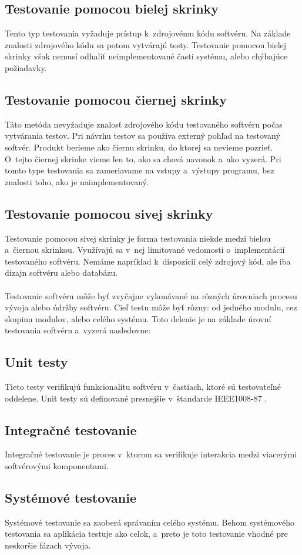 \subsection*{Testovanie pomocou bielej skrinky}
Tento typ testovania vyžaduje prístup k~zdrojovému kódu softvéru. Na základe znalosti zdrojového kódu sa potom vytvárajú testy.
Testovanie pomocou bielej skrinky však nemusí odhaliť neimplementované časti systému, alebo chýbajúce požiadavky.
\subsection*{Testovanie pomocou čiernej skrinky}
Táto metóda nevyžaduje znalosť zdrojového kódu testovaného softvéru počas vytvárania testov.
Pri návrhu testov sa používa externý pohľad na testovaný softvér. 
Produkt berieme ako čiernu skrinku, do ktorej sa nevieme pozrieť.
O~tejto čiernej skrinke vieme len to, ako sa chová navonok a~ako vyzerá.
Pri tomto type testovania sa zameriavame na vstupy a~výstupy programu, bez znalosti toho, ako je naimplementovaný.
\subsection*{Testovanie pomocou sivej skrinky}
Testovanie pomocou sivej skrinky je forma testovania niekde medzi bielou a~čiernou skrinkou. 
Využívajú sa v~nej limitované vedomosti o~implementácií testovaného softvéru.
Nemáme napríklad k~dispozícií celý zdrojový kód, ale iba dizajn softvéru alebo databázu.
\\
\\
Testovanie softvéru môže byť zvyčajne vykonávané na rôzných úrovniach 
procesu vývoja alebo údržby softvéru. Cieľ testu môže byť rôzny: od jedného
modulu, cez skupinu modulov, alebo celého systému.
Toto delenie je na základe úrovní testovania softvéru a~vyzerá nasledovne:
\subsection*{Unit testy}
Tieto testy verifikujú funkcionalitu softvéru v~častiach, ktoré sú testovateľné oddelene.
Unit testy sú definované presnejšie v~štandarde IEEE1008-87 \cite{Ieee_unit}.
\subsection*{Integračné testovanie}
Integračné testovanie je proces v~ktorom sa verifikuje interakcia medzi viacerými softvérovými komponentami.
\subsection*{Systémové testovanie}
Systémové testovanie sa zaoberá správaním celého systému. Behom systémového testovania sa aplikácia testuje ako celok,
a~preto je toto testovanie vhodné pre neskoršie fázach vývoja.
